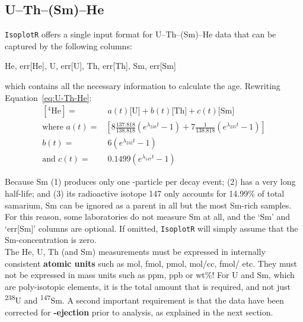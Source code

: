 \begin{refsection}

\chapter{U--Th--(Sm)--He}\label{ch:UThHe}

\texttt{IsoplotR} offers a single input format for U--Th--(Sm)--He
data that can be captured by the following columns:

\begin{center}
He, err[He], U, err[U], Th, err[Th], Sm, err[Sm]
\end{center}

\noindent which contains all the necessary information to calculate
the age. Rewriting Equation~\ref{eq:U-Th-He}:
\begin{equation}
\begin{split}
  \left[^4\mbox{He}\right] = & ~a(t) 
   \mbox{[U]} + b(t)\mbox{[Th]} + c(t)\mbox{[Sm]} \\
   \mbox{where~} a(t) = &
   \left[8 \frac{137.818}{138.818} (e^{\lambda_{238}t} - 1) +
     7 \frac{1}{138.818} (e^{\lambda_{235}t} - 1) \right] \\
   b(t) = & ~6 (e^{\lambda_{232}t} - 1)\\
    \mbox{and~} c(t) = & ~0.1499 (e^{\lambda_{147}t} - 1)
\end{split}
\label{eq:UThHe2}
\end{equation}

Because Sm (1) produces only one \textalpha-particle per decay event;
(2) has a very long half-life; and (3) its radioactive isotope 147
only accounts for 14.99\% of total samarium, Sm can be ignored as a
parent in all but the most Sm-rich samples. For this reason, some
laboratories do not measure Sm at all, and the `Sm' and `err[Sm]'
columns are optional. If omitted, \texttt{IsoplotR} will simply assume
that the Sm-concentration is zero.\\

The He, U, Th (and Sm) measurements must be expressed in internally
consistent \textbf{atomic units} such as mol, fmol, pmol, mol/cc,
fmol/ etc. They must not be expressed in mass units such as
ppm, ppb or wt\%! For U and Sm, which are poly-isotopic elements, it
is the total amount that is required, and not just
\textsuperscript{238}U and \textsuperscript{147}Sm. A second important
requirement is that the data have been corrected for
\textbf{\textalpha-ejection} prior to analysis, as explained in the
next section.


\end{refsection}
